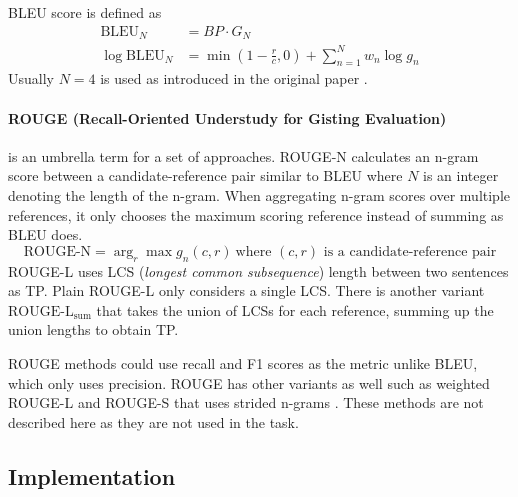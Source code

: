 \documentclass{article}
\begin{document}
BLEU score is defined as 
\begin{align}
    \text{BLEU}_N &= BP\cdot G_N\\
    \log\text{BLEU}_N &= \min(1-\frac{r}{c},0)+\sum_{n=1}^{N}w_n\log g_n
\end{align}
Usually $N=4$ is used as introduced in the original paper \cite{papineni_bleu_2002}.
\paragraph{ROUGE (Recall-Oriented Understudy for
Gisting Evaluation)}
is an umbrella term for a set of approaches. ROUGE-N calculates an n-gram score between a candidate-reference pair similar to BLEU where $N$ is an integer denoting the length of the n-gram. When aggregating n-gram scores over multiple references, it only chooses the maximum scoring reference instead of summing as BLEU does. 
\begin{equation}
    \text{ROUGE-N} = \arg_r\max g_n(c,r)\ \scriptstyle{\text{where $(c,r)$ is a candidate-reference pair}}
\end{equation}
ROUGE-L uses LCS (\textit{longest common subsequence}) length between two sentences as TP. Plain ROUGE-L only considers a single LCS. There is another variant $\text{ROUGE-L}_{\text{sum}}$ that takes the union of LCSs for each reference, summing up the union lengths to obtain TP. 

ROUGE methods could use recall and F1 scores as the metric unlike BLEU, which only uses precision. ROUGE has other variants as well such as weighted ROUGE-L and ROUGE-S that uses strided n-grams \cite{lin_rouge_2004}. These methods are not described here as they are not used in the task. 
\subsection{Implementation}
\end{document}
